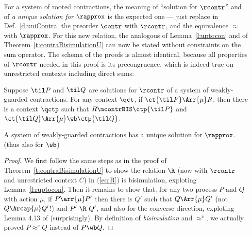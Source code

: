 For a system of rooted contractions, the meaning of
``solution for $\rcontr$'' and of \emph{a unique solution for $\rapprox$}
is the expected one --- just replace in Def.~\ref{d:uniContra}  the preorder
$\contr$ with $\rcontr$, and the equivalence
$\approx$ with $\rapprox$.
%
For this new relation, the analogous of Lemma~\ref{l:uptocon} and of
Theorem~\ref{t:contraBisimulationU} can now be stated without constraints on the sum
operator.
The schema of the proofs is almost identical, because all
properties of $\rcontr$ needed in this proof is its precongruence, which is
indeed true on unrestricted contexts including direct sums:
\begin{lemma}
\label{l:ruptocon}
Suppose $\til P$ and $\til Q$ are solutions  for $\rcontr$
 of a system of weakly-guarded
contractions.
For any context $\qct$,
if  $\ct{\til P}\Arr{\mu}  R$,
 then
there is a  context $\qctp$
such that $R \mcontrBIS \ctp{\til P}$ and  $\ct{\til Q} \Arr{\mu}
 \wb \ctp{\til Q}$.
\end{lemma}

\begin{theorem}
\label{t:rcontraBisimulationU}
A system of weakly-guarded contractions has a unique solution
 for $\rapprox$. (thus also for $\wb$)
\end{theorem}

\begin{proof}
We first follow the same steps as in the proof of
Theorem~\ref{t:contraBisimulationU} to show the relation $\R$ (now
with $\rcontr$ and unrestricted context $C$) in (\ref{eq:R}) is bisimulation,
exploting Lemma~\ref{l:ruptocon}. Then it remains to show that, for
any two process $P$ and $Q$ with action $\mu$, if $P \arr{\mu} P'$ then
there is $Q'$ such that $Q \Arr{\mu} Q'$ (not $Q \Arcap{\mu} Q'$!) and
$P'\ \R\ Q'$, and also for the converse direction, exploting Lemma
4.13 of \cite{Mil89} (surprisingly). By definition of
\emph{bisimulation} and $\approx^c$, we actually proved $P
\approx^c Q$ instead of $P \wb Q$.
\end{proof}

